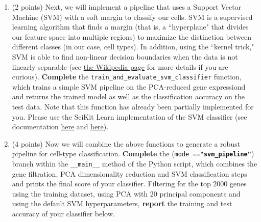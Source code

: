 \begin{enumerate}
\begin{solution}
\end{solution}

\item (2 points) Next, we will implement a pipeline that uses a Support Vector Machine (SVM) with a soft margin to classify our cells. SVM is a supervised learning algorithm that finds a margin (that is, a ``hyperplane" that divides our feature space into multiple regions) to maximize the distinction between different classes (in our case, cell types). In addition, using the ``kernel trick," SVM is able to find non-linear decision boundaries when the data is not linearly separable (see \href{https://en.wikipedia.org/wiki/Kernel_method}{the Wikipedia page} for more details if you are curious). \textbf{Complete} the \texttt{train\_and\_evaluate\_svm\_classifier} function, which trains a simple SVM pipeline on the PCA-reduced gene expressiond and returns the trained model as well as the classification accuracy on the test data. Note that this function has already been partially implemented for you. Please use the SciKit Learn implementation of the SVM classifier (see documentation \href{https://scikit-learn.org/stable/modules/generated/sklearn.svm.SVC.html}{here} and \href{https://scikit-learn.org/stable/modules/generated/sklearn.pipeline.Pipeline.html}{here}).

\item (4 points) Now we will combine the above functions to generate a robust pipeline for cell-type classification. \textbf{Complete} the (\texttt{mode ==\textbf{"svm\_pipeline"}}) branch within the \texttt{\_\_main\_\_} method of the Python script, which combines the gene filtration, PCA dimensionality reduction and SVM classification steps and prints the final score of your classifier. Filtering for the top $2000$ genes using the training dataset, using PCA with $20$ principal components and using the default SVM hyperparameters, \textbf{report} the training and test accuracy of your classifier below.

\begin{solution}
\end{solution}
\end{enumerate}
